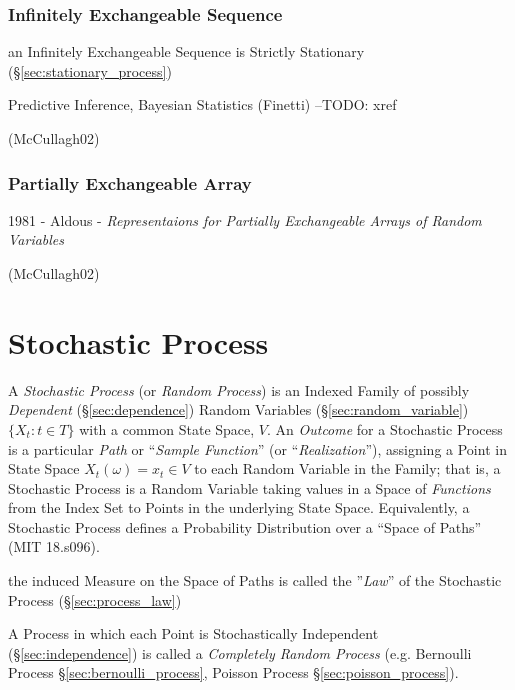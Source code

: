 \subsubsection{Infinitely Exchangeable Sequence}
\label{sec:infinitely_exchangeable}

an Infinitely Exchangeable Sequence is Strictly Stationary
(\S\ref{sec:stationary_process})

Predictive Inference, Bayesian Statistics (Finetti) --TODO: xref

(McCullagh02)



\subsubsection{Partially Exchangeable Array}
\label{sec:partially_exchangeable}

1981 - Aldous -
\emph{Representaions for Partially Exchangeable Arrays of Random Variables}

(McCullagh02)



\section{Stochastic Process}\label{sec:stochastic_process}

A \emph{Stochastic Process} (or \emph{Random Process}) is an Indexed Family of
possibly \emph{Dependent} (\S\ref{sec:dependence}) Random Variables
(\S\ref{sec:random_variable}) $\{ X_t : t \in T \}$ with a common State Space,
$V$. An \emph{Outcome} for a Stochastic Process is a particular \emph{Path} or
``\emph{Sample Function}'' (or ``\emph{Realization}''), assigning a Point in
State Space $X_t(\omega) = x_t \in V$ to each Random Variable in the Family;
that is, a Stochastic Process is a Random Variable taking values in a Space of
\emph{Functions} from the Index Set to Points in the underlying State Space.
Equivalently, a Stochastic Process defines a Probability Distribution over a
``Space of Paths'' (MIT 18.s096).

the induced Measure on the Space of Paths is called the ''\emph{Law}'' of the
Stochastic Process (\S\ref{sec:process_law})

A Process in which each Point is Stochastically Independent
(\S\ref{sec:independence}) is called a \emph{Completely Random Process} (e.g.
Bernoulli Process \S\ref{sec:bernoulli_process}, Poisson Process
\S\ref{sec:poisson_process}).

